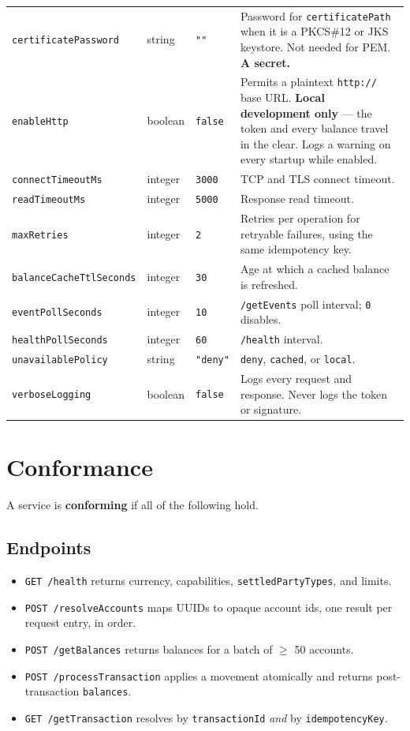 \documentclass[11pt,a4paper]{article}
\newcommand{\code}[1]{\texttt{\small #1}}
\begin{document}
\begin{longtable}{L{4.4cm} L{1.5cm} L{1.6cm} L{6.4cm}}
\code{certificatePassword} & string & \code{""} &
  Password for \code{certificatePath} when it is a PKCS\#12 or JKS keystore. Not needed for PEM.
  \textbf{A secret.}\\
\code{enableHttp} & boolean & \code{false} &
  Permits a plaintext \code{http://} base URL. \textbf{Local development only} --- the token and
  every balance travel in the clear. Logs a warning on every startup while enabled.\\
\code{connectTimeoutMs} & integer & \code{3000} & TCP and TLS connect timeout.\\
\code{readTimeoutMs} & integer & \code{5000} & Response read timeout.\\
\code{maxRetries} & integer & \code{2} &
  Retries per operation for retryable failures, using the same idempotency key.\\
\code{balanceCacheTtlSeconds} & integer & \code{30} & Age at which a cached balance is refreshed.\\
\code{eventPollSeconds} & integer & \code{10} & \code{/getEvents} poll interval; \code{0} disables.\\
\code{healthPollSeconds} & integer & \code{60} & \code{/health} interval.\\
\code{unavailablePolicy} & string & \code{"deny"} & \code{deny}, \code{cached}, or \code{local}.\\
\code{verboseLogging} & boolean & \code{false} &
  Logs every request and response. Never logs the token or signature.\\
\bottomrule
\end{longtable}

\section{Conformance}
\label{sec:conformance}

A service is \textbf{conforming} if all of the following hold.

\subsection*{Endpoints}
\begin{itemize}[label=$\square$]
\item \code{GET /health} returns currency, capabilities, \code{settledPartyTypes}, and limits.
\item \code{POST /resolveAccounts} maps UUIDs to opaque account ids, one result per request entry,
      in order.
\item \code{POST /getBalances} returns balances for a batch of $\geq$ 50 accounts.
\item \code{POST /processTransaction} applies a movement atomically and returns post-transaction
      \code{balances}.
\item \code{GET /getTransaction} resolves by \code{transactionId} \emph{and} by
      \code{idempotencyKey}.
\end{itemize}
\end{document}

